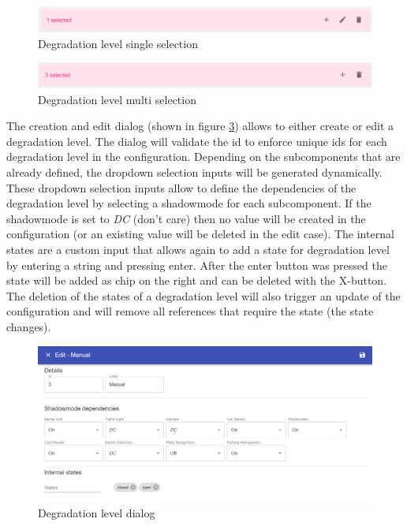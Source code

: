 \begin{figure}[ht]
    \centering
    \includegraphics[width=\textwidth]{img/degradation_level_crud_single.PNG}
    \caption{Degradation level single selection}
    \label{fig:degradation_crud_level_single}
\end{figure}

\begin{figure}[ht]
    \centering
    \includegraphics[width=\textwidth]{img/degradation_level_crud_multi.PNG}
    \caption{Degradation level multi selection}
    \label{fig:degradation_crud_level_multi}
\end{figure}

The creation and edit dialog (shown in figure \ref{fig:degradation_level_dialog}) allows to either create or edit a degradation level. The dialog will validate the id to enforce unique ids for each degradation level in the configuration. Depending on the subcomponents that are already defined, the dropdown selection inputs will be generated dynamically. These dropdown selection inputs allow to define the dependencies of the degradation level by selecting a shadowmode for each subcomponent. If the shadowmode is set to \textit{DC} (don't care) then no value will be created in the configuration (or an existing value will be deleted in the edit case). The internal states are a custom input that allows again to add a state for degradation level by entering a string and pressing enter. After the enter button was pressed the state will be added as chip on the right and can be deleted with the X-button. 
The deletion of the states of a degradation level will also trigger an update of the configuration and will remove all references that require the state (the state changes).

\begin{figure}[ht]
    \centering
    \includegraphics[width=\textwidth]{img/degradation_level_dialog.png}
    \caption{Degradation level dialog}
    \label{fig:degradation_level_dialog}
\end{figure}


